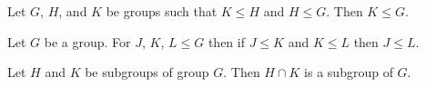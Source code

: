 \begin{definition}
    \label{definition : subgroup_trans}
    \leanok
    Let $G$, $H$, and $K$ be groups such that $K \leq H$ and $H \leq G$. Then $K \leq G$.
\end{definition}

\begin{theorem}
    \label{theorem : sgp_trans}
    \leanok
    Let $G$ be a group. For $J$, $K$, $L \leq G$ then if $J \leq K$ and $K \leq L$ then $J \leq L$.
\end{theorem}

\begin{definition}
    \label{definition : subgroup_intersection}
    \leanok
    Let $H$ and $K$ be subgroups of group $G$. Then $H \cap K$ is a subgroup of $G$.
\end{definition}
